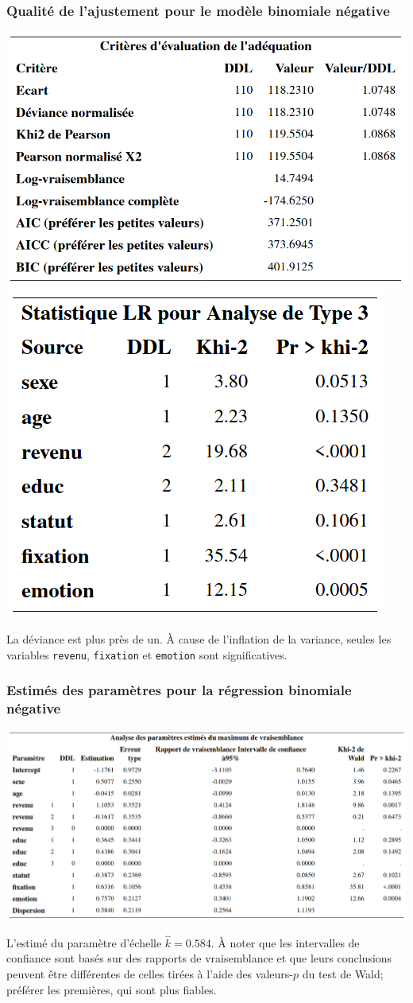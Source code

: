 \documentclass{beamer}
\begin{document}
\begin{frame}[fragile]
\frametitle{Qualité de l'ajustement pour le modèle binomiale négative}
\begin{center}
\includegraphics[width = 0.6\linewidth]{img/c4/diapos8-e6}
\includegraphics[width = 0.39\linewidth]{img/c4/diapos8-e7}
\end{center}
La déviance est plus près de un. À cause de l'inflation de la variance, seules les variables \texttt{revenu}, \texttt{fixation} et \texttt{emotion} sont significatives.
\end{frame}

\begin{frame}[fragile]
\frametitle{Estimés des paramètres pour la régression binomiale négative}
\begin{center}
\includegraphics[width = 0.99\linewidth]{img/c4/diapos8-e8}
\end{center}
{\footnotesize 
L'estimé du paramètre d'échelle $\hat{k} = 0.584$. À noter que les intervalles de confiance sont basés sur des rapports de vraisemblance et que leurs conclusions peuvent être différentes de celles tirées à l'aide des valeurs-$p$ du test de Wald; préférer les premières, qui sont plus fiables.


}
\end{frame}
\end{document}
